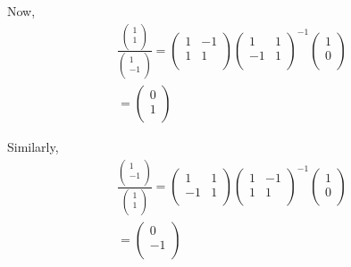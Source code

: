 \documentclass[journal,12pt,twocolumn]{IEEEtran}
\begin{document}
Now,\\

\begin{align}
     \frac{\begin{pmatrix}
      1 \\ 
      1 \\
      \end{pmatrix}}{\begin{pmatrix}
      1 \\ 
      -1 \\
      \end{pmatrix}} = \begin{pmatrix}
      1    & -1\\ 
      1    & 1\\
      \end{pmatrix}\begin{pmatrix}
      1    & 1\\ 
      -1    & 1\\
      \end{pmatrix}^{-1}\begin{pmatrix}
      1\\ 
      0\\
      \end{pmatrix}\\
      = \begin{pmatrix}
      0\\ 
      1\\
      \end{pmatrix}
\end{align}

Similarly,\\

\begin{align}
     \frac{\begin{pmatrix}
      1 \\ 
      -1 \\
      \end{pmatrix}}{\begin{pmatrix}
      1 \\ 
      1 \\
      \end{pmatrix}} = \begin{pmatrix}
      1    & 1\\ 
      -1    & 1\\
      \end{pmatrix}\begin{pmatrix}
      1    & -1\\ 
      1    & 1\\
      \end{pmatrix}^{-1}\begin{pmatrix}
      1\\ 
      0\\
      \end{pmatrix}\\
      = \begin{pmatrix}
      0\\ 
      -1\\
      \end{pmatrix}
\end{align}
\end{document}
